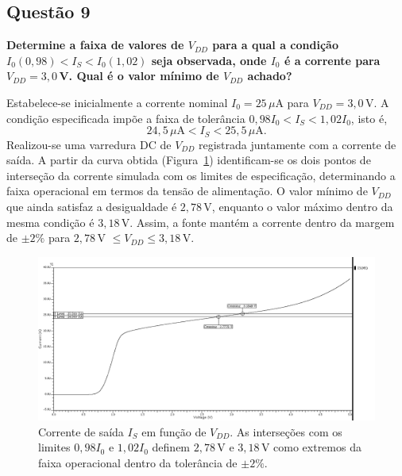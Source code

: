 \documentclass[12pt,a4paper]{article}
\begin{document}
\subsection*{Questão 9}
\begin{BoxQ}
	\textbf{Determine a faixa de valores de $V_{DD}$ para a qual a condição $I_0(0{,}98) < I_S < I_0(1{,}02)$ seja observada, onde $I_0$ é a corrente para $V_{DD} = 3{,}0$\,V. Qual é o valor mínimo de $V_{DD}$ achado?}
\end{BoxQ}
Estabelece-se inicialmente a corrente nominal $I_0 = 25\,\mu\text{A}$ para $V_{DD}=3{,}0$\,V. A condição especificada impõe a faixa de tolerância $0{,}98 I_0 < I_S < 1{,}02 I_0$, isto é,
\begin{equation*}
24{,}5\,\mu\text{A} < I_S < 25{,}5\,\mu\text{A}.
\end{equation*}
Realizou-se uma varredura DC de $V_{DD}$ registrada juntamente com a corrente de saída. A partir da curva obtida (Figura~\ref{fig:corrente_maxima_minima}) identificam-se os dois pontos de interseção da corrente simulada com os limites de especificação, determinando a faixa operacional em termos da tensão de alimentação. O valor mínimo de $V_{DD}$ que ainda satisfaz a desigualdade é $2{,}78$\,V, enquanto o valor máximo dentro da mesma condição é $3{,}18$\,V. Assim, a fonte mantém a corrente dentro da margem de $\pm 2\%$ para $2{,}78$\,V $\leq V_{DD} \leq 3{,}18$\,V.

\begin{figure}[H]
    \centering
    \includegraphics[width=1\textwidth]{images/corrente_maxima_minima.png}
    \caption{Corrente de saída $I_S$ em função de $V_{DD}$. As interseções com os limites $0{,}98 I_0$ e $1{,}02 I_0$ definem $2{,}78$\,V e $3{,}18$\,V como extremos da faixa operacional dentro da tolerância de $\pm 2\%$.}
    \label{fig:corrente_maxima_minima}
\end{figure}
\end{document}

